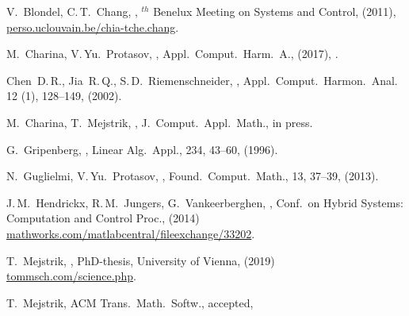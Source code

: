 \begin{thebibliography}{}
    
    V.~Blondel, C.\,T.~Chang, 
    ,
    $^{th}$ Benelux Meeting on Systems and Control, (2011),
    \newblock \href{https://perso.uclouvain.be/chia-tche.chang/code.php}{perso.uclouvain.be/chia-tche.chang}.
    
    M.~Charina, V.\,Yu.~Protasov,
    ,
    \newblock Appl.\ Comput.\ Harm.\ A., (2017),
    .

    
    
    Chen~D.\,R., Jia~R.\,Q., S.\,D.~Riemenschneider,
    ,
    \newblock Appl.\ Comput.\ Harmon.\ Anal.\, 12 (1), 128--149, (2002).    
    
    M.~Charina, T.~Mejstrik,
    ,
    \newblock J.\ Comput.\ Appl.\ Math., in press.
    
    G.~Gripenberg,
    ,
    \newblock Linear Alg.\ Appl., 234, 43--60, (1996).
    
    N.~Guglielmi, V.\,Yu.~Protasov,
    ,
    \newblock Found.\ Comput.\ Math., 13, 37--39, (2013).
    
    J.\,M.~Hendrickx, R.\,M.~Jungers, G.~Vankeerberghen,
    ,
    \newblock Conf.\ on Hybrid Systems: Computation and Control Proc., (2014)
    \newblock \href{https://de.mathworks.com/matlabcentral/fileexchange/33202-the-jsr-toolbox}{mathworks.com/matlabcentral/fileexchange/33202}.
    
    T.~Mejstrik,
    ,
    \newblock PhD-thesis, University of Vienna, (2019)
    \href{http://tommsch.com/science.php}{tommsch.com/science.php}.
    
    T.~Mejstrik,
    \newblock  ACM Trans.\ Math.\ Softw., accepted,
    

\end{thebibliography}
